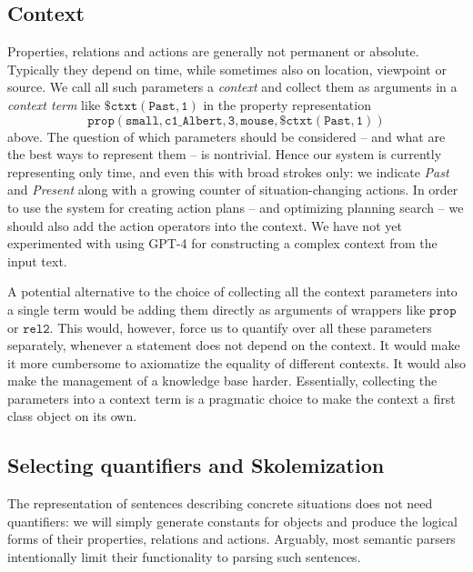 \documentclass[runningheads]{llncs}
\begin{document}
\subsection{Context}

Properties, relations and actions are generally not permanent or absolute. Typically they depend on time, while sometimes also on location, viewpoint or source.
We call all such parameters a {\em context} and collect them as arguments in a {\em context term} like $\mathtt{\$ctxt(Past,1)}$ in the property 
representation 
$$\mathtt{prop(small,c1\_Albert,3,mouse,\$ctxt(Past,1))}$$ above.
The question of
which parameters should be considered -- and what are the best ways to represent them -- is nontrivial. Hence our system is currently representing only time,
and even this with broad strokes only: we indicate {\em Past} and {\em Present} along with a growing counter of situation-changing actions. In order to use the
system for creating action plans -- and optimizing planning search -- we should also add the action operators into the context. We have not yet experimented
with using GPT-4 for constructing a complex context from the input text.

A potential alternative to the choice of collecting all the context parameters into a single term would be adding them directly as arguments of wrappers like $\mathtt{prop}$ or
$\mathtt{rel2}$. This would, however, force us to quantify over all these parameters separately, whenever a statement does not depend on the context. It would make it more
cumbersome to axiomatize the equality of different contexts. It would also make the management of a knowledge base harder. Essentially, collecting the parameters into a context term
is a pragmatic choice to make the context a first class object on its own. 


\subsection{Selecting quantifiers and Skolemization}

The representation of sentences describing concrete situations does not need quantifiers: we will 
simply generate constants for objects and produce the logical forms of their properties, relations and actions.
Arguably, most semantic parsers intentionally limit their functionality to parsing such sentences.
\end{document}
